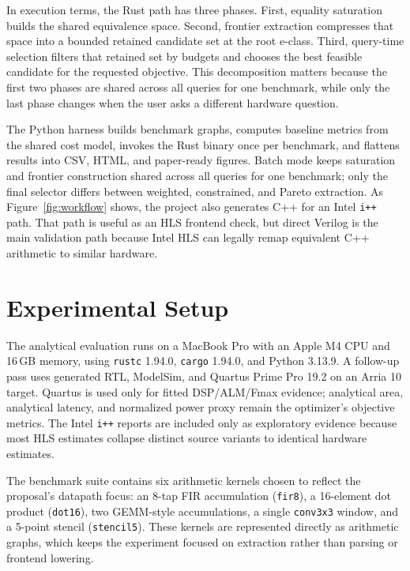 \documentclass[sigplan,10pt,review]{acmart}
\begin{document}
In execution terms, the Rust path has three phases. First, equality saturation builds the shared equivalence space. Second, frontier extraction compresses that space into a bounded retained candidate set at the root e-class. Third, query-time selection filters that retained set by budgets and chooses the best feasible candidate for the requested objective. This decomposition matters because the first two phases are shared across all queries for one benchmark, while only the last phase changes when the user asks a different hardware question.

The Python harness builds benchmark graphs, computes baseline metrics from the shared cost model, invokes the Rust binary once per benchmark, and flattens results into CSV, HTML, and paper-ready figures. Batch mode keeps saturation and frontier construction shared across all queries for one benchmark; only the final selector differs between weighted, constrained, and Pareto extraction. As Figure~\ref{fig:workflow} shows, the project also generates C++ for an Intel \texttt{i++} path. That path is useful as an HLS frontend check, but direct Verilog is the main validation path because Intel HLS can legally remap equivalent C++ arithmetic to similar hardware.

\section{Experimental Setup}
The analytical evaluation runs on a MacBook Pro with an Apple M4 CPU and 16\,GB memory, using \texttt{rustc} 1.94.0, \texttt{cargo} 1.94.0, and Python 3.13.9. A follow-up pass uses generated RTL, ModelSim, and Quartus Prime Pro 19.2 on an Arria 10 target. Quartus is used only for fitted DSP/ALM/Fmax evidence; analytical area, analytical latency, and normalized power proxy remain the optimizer's objective metrics. The Intel \texttt{i++} reports are included only as exploratory evidence because most HLS estimates collapse distinct source variants to identical hardware estimates.

The benchmark suite contains six arithmetic kernels chosen to reflect the proposal's datapath focus: an 8-tap FIR accumulation (\texttt{fir8}), a 16-element dot product (\texttt{dot16}), two GEMM-style accumulations, a single \texttt{conv3x3} window, and a 5-point stencil (\texttt{stencil5}). These kernels are represented directly as arithmetic graphs, which keeps the experiment focused on extraction rather than parsing or frontend lowering.
\end{document}
